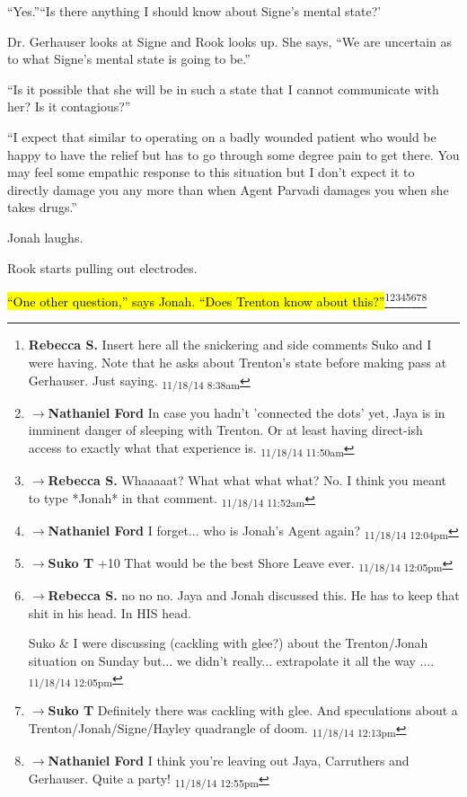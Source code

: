 ``Yes.''``Is there anything I should know about Signe's mental state?'

Dr. Gerhauser looks at Signe and Rook looks up.  She says, ``We are uncertain as to what Signe's mental state is going to be.''

``Is it possible that she will be in such a state that I cannot communicate with her?  Is it contagious?''

``I expect that similar to operating on a badly wounded patient who would be happy to have the relief but has to go through some degree pain to get there.  You may feel some empathic response to this situation but I don't expect it to directly damage you any more than when Agent Parvadi damages you when she takes drugs.''

Jonah laughs.  

Rook starts pulling out electrodes.

\hl{``One other question,'' says Jonah.  ``Does Trenton know about this?''}\footnote{\textbf{Rebecca S. }Insert here all the snickering and side comments Suko and I were having.  Note that he asks about Trenton's state before making pass at Gerhauser.  Just saying. \textsubscript{11/18/14 8:38am}}\footnote{$\rightarrow$\textbf{Nathaniel Ford }In case you hadn't 'connected the dots' yet, Jaya is in imminent danger of sleeping with Trenton. Or at least having direct-ish access to exactly what that experience is. \textsubscript{11/18/14 11:50am}}\footnote{$\rightarrow$\textbf{Rebecca S. }Whaaaaat?  What what what what?  No.  I think you meant to type *Jonah* in that comment. \textsubscript{11/18/14 11:52am}}\footnote{$\rightarrow$\textbf{Nathaniel Ford }I forget... who is Jonah's Agent again? \textsubscript{11/18/14 12:04pm}}\footnote{$\rightarrow$\textbf{Suko T }+10  That would be the best Shore Leave ever. \textsubscript{11/18/14 12:05pm}}\footnote{$\rightarrow$\textbf{Rebecca S. }no no no. Jaya and Jonah discussed this. He has to keep that shit in his head.  In HIS head. 

Suko \& I were discussing (cackling with glee?) about the Trenton/Jonah situation on Sunday but... we didn't really... extrapolate it all the way .... \textsubscript{11/18/14 12:05pm}}\footnote{$\rightarrow$\textbf{Suko T }Definitely there was cackling with glee.  And speculations about a Trenton/Jonah/Signe/Hayley quadrangle of doom. \textsubscript{11/18/14 12:13pm}}\footnote{$\rightarrow$\textbf{Nathaniel Ford }I think you're leaving out Jaya, Carruthers and Gerhauser. Quite a party! \textsubscript{11/18/14 12:55pm}}

